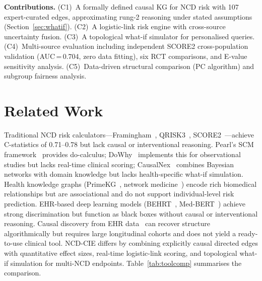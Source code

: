 \documentclass[runningheads]{llncs}
\begin{document}
\noindent\textbf{Contributions.}
(C1)~A formally defined causal KG for NCD risk with 107
expert-curated edges, approximating rung-2 reasoning under stated
assumptions (Section~\ref{sec:whatif}).
(C2)~A logistic-link risk engine with cross-source uncertainty fusion.
(C3)~A topological what-if simulator for personalised queries.
(C4)~Multi-source evaluation including independent SCORE2
cross-population validation (AUC\,=\,0.704, zero data fitting),
six RCT comparisons, and E-value sensitivity analysis.
(C5)~Data-driven structural comparison (PC algorithm) and
subgroup fairness analysis.

\section{Related Work}\label{sec:related}

Traditional NCD risk calculators---Framingham~\cite{dagostino2008},
QRISK3~\cite{hippisley2017qrisk3}, SCORE2~\cite{score22021}---achieve
C-statistics of 0.71--0.78 but lack causal or interventional reasoning.
Pearl's SCM framework~\cite{pearl2009causality} provides do-calculus;
DoWhy~\cite{sharma2020dowhy} implements this for observational studies
but lacks real-time clinical scoring;
CausalNex~\cite{beaumont2021causalnex} combines Bayesian networks
with domain knowledge but lacks health-specific what-if simulation.
Health knowledge graphs (PrimeKG~\cite{chandak2023primekg},
network medicine~\cite{barabasi2011network}) encode rich biomedical
relationships but are associational and do not support
individual-level risk prediction.
EHR-based deep learning models (BEHRT~\cite{li2020behrt},
Med-BERT~\cite{rasmy2021medbert}) achieve strong discrimination
but function as black boxes without causal or interventional
reasoning.
Causal discovery from EHR data~\cite{prosperi2020causal} can
recover structure algorithmically but requires large longitudinal
cohorts and does not yield a ready-to-use clinical tool.
NCD-CIE differs by combining explicitly causal directed edges
with quantitative effect sizes, real-time logistic-link scoring,
and topological what-if simulation for multi-NCD endpoints.
Table~\ref{tab:toolcomp} summarises the comparison.
\end{document}
